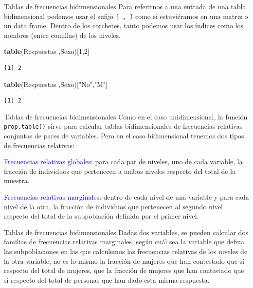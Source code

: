 \documentclass[
  ignorenonframetext,
]{beamer}
\newenvironment{Shaded}{\begin{snugshade}}{\end{snugshade}}
\newcommand{\DecValTok}[1]{\textcolor[rgb]{0.00,0.00,0.81}{#1}}
\newcommand{\FunctionTok}[1]{\textcolor[rgb]{0.13,0.29,0.53}{\textbf{#1}}}
\newcommand{\NormalTok}[1]{#1}
\newcommand{\StringTok}[1]{\textcolor[rgb]{0.31,0.60,0.02}{#1}}
\newcommand\blue[1]{\textcolor{blue}{#1}}
\begin{document}
\begin{frame}[fragile]{Tablas de frecuencias bidimensionales}
\label{tablas-de-frecuencias-bidimensionales-2}
Para referirnos a una entrada de una tabla bidimensional podemos usar el
sufijo \texttt{{[}\ ,\ {]}} como si estuviéramos en una matriz o un data
frame. Dentro de los corchetes, tanto podemos usar los índices como los
nombres (entre comillas) de los niveles.

\begin{Shaded}
\begin{Highlighting}[]
\FunctionTok{table}\NormalTok{(Respuestas ,Sexo)[}\DecValTok{1}\NormalTok{,}\DecValTok{2}\NormalTok{]}
\end{Highlighting}
\end{Shaded}

\begin{verbatim}
[1] 2
\end{verbatim}

\begin{Shaded}
\begin{Highlighting}[]
\FunctionTok{table}\NormalTok{(Respuestas ,Sexo)[}\StringTok{"No"}\NormalTok{,}\StringTok{"M"}\NormalTok{]}
\end{Highlighting}
\end{Shaded}

\begin{verbatim}
[1] 2
\end{verbatim}
\end{frame}

\begin{frame}[fragile]{Tablas de frecuencias bidimensionales}
\label{tablas-de-frecuencias-bidimensionales-3}
Como en el caso unidimensional, la función \texttt{prop.table()} sirve
para calcular tablas bidimensionales de frecuencias relativas conjuntas
de pares de variables. Pero en el caso bidimensional tenemos dos tipos
de frecuencias relativas:

\blue{Frecuencias relativas globales}: para cada par de niveles, uno de
cada variable, la fracción de individuos que pertenecen a ambos niveles
respecto del total de la muestra.

\blue{Frecuencias relativas marginales}: dentro de cada nivel de una
variable y para cada nivel de la otra, la fracción de individuos que
pertenecen al segundo nivel respecto del total de la subpoblación
definida por el primer nivel.
\end{frame}

\begin{frame}{Tablas de frecuencias bidimensionales}
\label{tablas-de-frecuencias-bidimensionales-4}
Dadas dos variables, se pueden calcular dos familias de frecuencias
relativas marginales, según cuál sea la variable que defina las
subpoblaciones en las que calculemos las frecuencias relativas de los
niveles de la otra variable; no es lo mismo la fracción de mujeres que
han contestado que sí respecto del total de mujeres, que la fracción de
mujeres que han contestado que sí respecto del total de personas que han
dado esta misma respuesta.
\end{frame}
\end{document}
